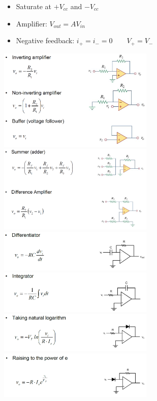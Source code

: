 \documentclass[10pt]{article}
\begin{document}
\begin{multicols*}{3}
\begin{itemize}[topsep=0pt,noitemsep]
    \item Saturate at $+V_{cc}$ and $-V_{cc}$
    \item Amplifier: $V_{out}=AV_{in}$
    \item Negative feedback: $i_+=i_-=0\qquad V_+=V_-$
\end{itemize}
\begin{center}
    \includegraphics[width=20em]{images/opamp_1.png}
    \includegraphics[width=20em]{images/opamp_2.png}
    \includegraphics[width=20em]{images/opamp_3.png}
    \includegraphics[width=20em]{images/opamp_4.png}
    \includegraphics[width=20em]{images/opamp_5.png}
    \includegraphics[width=20em]{images/opamp_6.png}
\end{center}


\end{multicols*}
\end{document}
